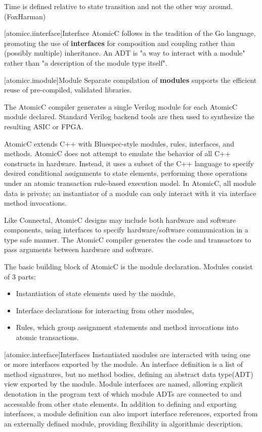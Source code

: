 Time is defined relative to state transition and not the other way around.
(FoxHarman)

[atomicc.iinterface]{Interface}
AtomicC follows in the tradition of the Go language\cite{Pike2012},
promoting the use of \textbf{interfaces} for composition and
coupling rather than (possibly multiple) inheritance.
An ADT is "a way to interact with a module" rather than "a description
of the module type itself".

[atomicc.imodule]{Module}
Separate compilation of \textbf{modules}
supports the efficient reuse of pre-compiled, validated
libraries.

The AtomicC compiler 
generates a single Verilog module for each AtomicC module declared.
Standard Verilog backend tools are then used to synthesize
the resulting ASIC or FPGA.

AtomicC extends C++
with Bluespec-style\cite{Bluespec:www,Hoe:Thesis,HoeArvind:TRS_Synthesis2}
modules, rules, interfaces, and methods.
AtomicC does not attempt to emulate the behavior of all C++ constructs in hardware.
Instead, it uses a subset of the C++ language to specify desired
conditional assignments to state elements,
performing these operations under an atomic transaction rule-based execution model.
In AtomicC, all module data is private; an instantiator of a module can only 
interact with it via interface method invocations.

Like Connectal, AtomicC designs may include both hardware and
software components, using interfaces to specify hardware/software communication
in a type safe manner. The AtomicC compiler generates the code and transactors to pass
arguments between hardware and software.

The basic building block of AtomicC is the module declaration.
Modules consist of 3 parts:
\begin{itemize}
\item Instantiation of state elements used by the module,
\item Interface declarations for interacting from other modules,
\item Rules, which group assignment statements and method invocations into atomic transactions.
\end{itemize}

[atomicc.interface]{Interfaces}
Instantiated modules are interacted with using one or more interfaces exported by the module.
An interface definition is a list of method signatures, but no method bodies, defining
an abstract data type(ADT) \cite{Liskov74programmingwith} view exported by the module.
Module interfaces are named, 
allowing explicit denotation in the program text
of which module ADTs are connected to and accessable from other state elements.
In addition to defining and exporting interfaces,
a module definition can also import
interface references, exported from an
externally defined module, providing flexibility in algorithmic description.

